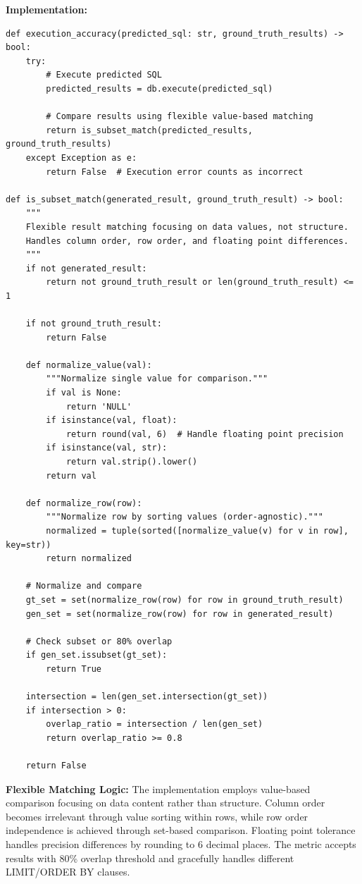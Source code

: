 \textbf{Implementation:}
\begin{lstlisting}[style=pythonstyle]
def execution_accuracy(predicted_sql: str, ground_truth_results) -> bool:
    try:
        # Execute predicted SQL
        predicted_results = db.execute(predicted_sql)
        
        # Compare results using flexible value-based matching
        return is_subset_match(predicted_results, ground_truth_results)
    except Exception as e:
        return False  # Execution error counts as incorrect

def is_subset_match(generated_result, ground_truth_result) -> bool:
    """
    Flexible result matching focusing on data values, not structure.
    Handles column order, row order, and floating point differences.
    """
    if not generated_result:
        return not ground_truth_result or len(ground_truth_result) <= 1
    
    if not ground_truth_result:
        return False
    
    def normalize_value(val):
        """Normalize single value for comparison."""
        if val is None:
            return 'NULL'
        if isinstance(val, float):
            return round(val, 6)  # Handle floating point precision
        if isinstance(val, str):
            return val.strip().lower()
        return val
    
    def normalize_row(row):
        """Normalize row by sorting values (order-agnostic)."""
        normalized = tuple(sorted([normalize_value(v) for v in row], key=str))
        return normalized
    
    # Normalize and compare
    gt_set = set(normalize_row(row) for row in ground_truth_result)
    gen_set = set(normalize_row(row) for row in generated_result)
    
    # Check subset or 80% overlap
    if gen_set.issubset(gt_set):
        return True
    
    intersection = len(gen_set.intersection(gt_set))
    if intersection > 0:
        overlap_ratio = intersection / len(gen_set)
        return overlap_ratio >= 0.8
    
    return False
\end{lstlisting}

\textbf{Flexible Matching Logic:} The implementation employs value-based comparison focusing on data content rather than structure. Column order becomes irrelevant through value sorting within rows, while row order independence is achieved through set-based comparison. Floating point tolerance handles precision differences by rounding to 6 decimal places. The metric accepts results with 80\% overlap threshold and gracefully handles different LIMIT/ORDER BY clauses.

